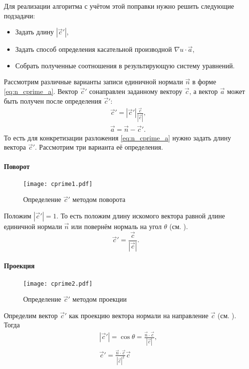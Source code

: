 Для реализации алгоритма с учётом этой поправки нужно решить следующие подзадачи:
\begin{itemize}
\item Задать длину $|\vec c'|$,
\item Задать способ определения касательной производной $\nabla u\cdot \vec a$, 
\item Собрать полученные соотношения в результирующую систему уравнений.
\end{itemize}

\label{sec:cprime_a}
Рассмотрим различные варианты записи единичной нормали $\vec n$ в форме \cref{eq:n_cprime_a}.
Вектор $\vec c'$ сонаправлен заданному вектору $\vec c$, а вектор $\vec a$ может быть получен после определения $\vec c'$:
\begin{align*}
&\vec c' = |\vec c'| \frac{\vec c}{|\vec c|},\\
&\vec a = \vec n - \vec c'.
\end{align*}
То есть для конкретизации разложения  \cref{eq:n_cprime_a} нужно задать длину вектора $\vec c'$.
Рассмотрим три варианта её определения.

\paragraph{Поворот}

\begin{figure}[h!]
\centering
\texttt{[image: cprime1.pdf]}
\caption{Определение $\vec c'$ методом поворота}
\label{fig:cprime1}
\end{figure}

Положим $|\vec c'| = 1$. То есть положим длину искомого вектора равной длине единичной нормали $\vec n$ или повернём нормаль на угол $\theta$ (см. ).
\begin{equation*}
\vec c' =  \frac{\vec c}{|\vec c|}.
\end{equation*}

\paragraph{Проекция}

\begin{figure}[h!]
\centering
\texttt{[image: cprime2.pdf]}
\caption{Определение $\vec c'$ методом проекции}
\label{fig:cprime2}
\end{figure}

Определим вектор $\vec c'$ как проекцию вектора нормали на направление $\vec c$ (см. ). Тогда
\begin{align*}
&|\vec c'| = \cos\theta = \frac{\vec n \cdot \vec c}{|\vec c|}, \\
&\vec c' = \frac{\vec n \cdot \vec c}{|\vec c|^2} \vec c
\end{align*}

